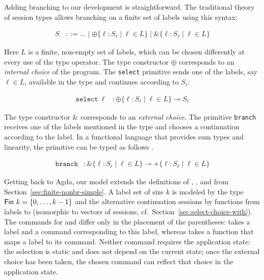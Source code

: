 \documentclass[acmsmall,screen]{acmart}
\newenvironment{traditional}{\begin{tcolorbox}[size=tight,arc=0ex,boxrule=0ex,colback=blue!20,top=-1.5ex]}{\end{tcolorbox}}
\begin{document}
Adding branching to our development is straightforward. The traditional 
theory of session types allows branching on a finite set of labels using this syntax:
\begin{traditional}
  \begin{align*}
    S & ::= \dots \mid \oplus\{ \ell : S_\ell \mid \ell \in L \} \mid
        \&\{\ell: S_\ell \mid \ell \in L\}
  \end{align*}
\end{traditional}
Here $L$ is a finite, non-empty set of labels, which can be chosen differently at
every use of the type operator. 
The type constructor $\oplus$ corresponds to an \emph{internal choice} of the
program.  The \texttt{select} primitive sends one of the labels, say $\ell \in L$, available in the
type and continues according to $S_\ell$:
\begin{traditional}
  \begin{align*}
    \mathtt{select}\ \ell &: \oplus\{ \ell : S_\ell \mid \ell \in L \}
                            \multimap S_\ell
  \end{align*}
\end{traditional}
The type constructor $\&$ corresponds to an \emph{external choice}. The
primitive \texttt{branch} receives one of the labels 
mentioned in the type and chooses a continuation according to the
label. In a functional language that provides sum types and linearity,
the primitive can be typed as follows \cite{DBLP:journals/toplas/Padovani19}.
\begin{traditional}
  \begin{align*}
    \mathtt{branch} &: \&\{\ell: S_\ell \mid \ell \in L\} \multimap +\{\ell: S_\ell \mid \ell \in L\}
  \end{align*}
\end{traditional}
Getting back to Agda, our model extends the definitions of
{\ASession}, {\ACommand}, and {\Aexecutor} from
Section~\ref{sec:finite-nonbr-simple}. A label set of size $k$ is
modeled by the type $\AFin~k = \{ 0, \dots, k-1\}$ and the alternative continuation sessions by
functions from labels to {\ASession} (isomorphic to vectors of sessions, cf.\  Section~\ref{sec:select-choice-with}).
\stBranchingType
\stBranchingCommand
The commands for {\ACSELECT} and {\ACCHOICE} differ only in the
placement of the parentheses: {\ACSELECT} takes a label and a command
corresponding to this label, whereas {\ACCHOICE} takes a function that
maps a label to its command. Neither command requires the application
state: the selection is static and does not depend on the current
state; once the external choice has been taken, the chosen command can
reflect that choice in the application state.
\stExecutorSignature\vspace{-1.5\baselineskip}
\stBranchingExecutor
\end{document}
